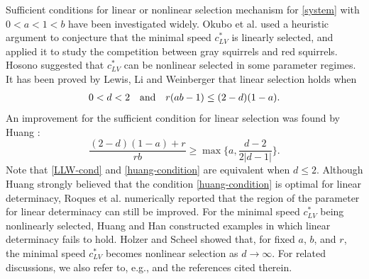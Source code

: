 \documentclass[11pt,a4paper]{article}
\numberwithin{equation}{section}
\numberwithin{figure}{section}
\newcommand\bea{\begin{eqnarray}}
\newcommand\eea{\end{eqnarray}}
\newcommand\beaa{\begin{eqnarray*}}
\newcommand\eeaa{\end{eqnarray*}}
\begin{document}
Sufficient conditions for linear or nonlinear selection mechanism for \eqref{system} with 
$0<a<1<b$ have been investigated
widely.  Okubo et al. \cite{Okubo etal} used a heuristic argument to conjecture that the minimal speed $c_{LV}^{*}$ is linearly selected, and applied it to study the competition between gray squirrels and red squirrels.
Hosono \cite{Hosono 1998} suggested that $c_{LV}^{*}$ can be nonlinear selected in some parameter regimes.
It has been proved by Lewis, Li and Weinberger \cite{Lewis Li Weinberger 1} that linear selection holds when
\bea\label{LLW-cond}
0<d<2\quad {\rm and}\quad  r(ab-1)\leq (2-d)(1-a).
\eea
An improvement for the sufficient condition for linear selection was found by Huang \cite{Huang2010}:
\begin{equation}\label{huang-condition}
\frac{(2-d)(1-a)+r}{rb}\ge \max\Big\{a,\frac{d-2}{2|d-1|}\Big\}.
\end{equation}
Note that \eqref{LLW-cond} and \eqref{huang-condition} are equivalent when $d\leq 2$.
Although Huang \cite{Huang2010} strongly believed that the condition \eqref{huang-condition} is optimal for linear determinacy,
Roques et al. \cite{Roques et al 2015} numerically reported that the region of the parameter for linear determinacy can still be improved. %
For the minimal speed $c_{LV}^{*}$ being nonlinearly selected, Huang and Han \cite{HuangHan2011} constructed examples in which linear determinacy fails to hold.
Holzer and Scheel \cite{Holzer Scheel 2012} showed that, for fixed $a$, $b$, and $r$,
 the minimal speed $c_{LV}^{*}$ becomes nonlinear selection as $d\to\infty$. %
For related discussions, we also refer to, e.g.,
\cite{Alhasanat Ou2019-1, Alhasanat Ou2019, Guo Liang, Hosono 1995, Hosono 2003} and the references cited therein.
\end{document}
